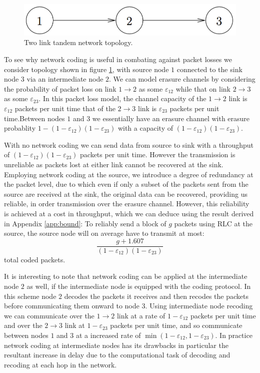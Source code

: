 \documentclass[12pt,a4paper,twoside,openright]{report}
\begin{document}
\begin{figure}[tbh]
	\centerline{\includegraphics[scale=0.9]{figs/tandem}}
	\caption{Two link tandem network topology.\cite{nc-intro}}
	\label{fig:tandem}
\end{figure}

To see why network coding is useful in combating against packet losses we consider topology shown in figure \ref{fig:tandem}, with source node $1$ connected to the sink node $3$ via an intermediate node $2$. We can model erasure channels by considering the probability of packet loss on link $1 \rightarrow 2$ as some $\varepsilon_{12}$ while that on link $2 \rightarrow 3$ as some $\varepsilon_{23}$. In this packet loss model, the channel capacity of the $1 \rightarrow 2$ link is $\varepsilon_{12}$ packets per unit time that of the $2 \rightarrow 3$ link is $\varepsilon_{23}$ packets per unit time.Between nodes $1$ and $3$ we essentially have an erasure channel with erasure probablity $1 - (1 - \varepsilon_{12})(1 - \varepsilon_{23})$ with a capacity of $(1 - \varepsilon_{12})(1 - \varepsilon_{23})$. 

With no network coding we can send data from source to sink with a throughput of $(1 - \varepsilon_{12})(1 - \varepsilon_{23})$ packets per unit time. However the transmission is unreliable as packets lost at either link cannot be recovered at the sink. Employing network coding at the source, we introduce a degree of redundancy at the packet level, due to which even if only a subset of the packets sent from the source are received at the sink, the original data can be recovered, providing us reliable, in order transmission over the erasure channel. However, this reliability is achieved at a cost in throughput, which we can deduce using the result derived in Appendix \ref{app:bound}: To reliably send a block of $g$ packets using RLC at the source, the source node will on average have to transmit at most:
\[ 
\frac{g + 1.607}{(1 - \varepsilon_{12})(1 - \varepsilon_{23})}
\]
total coded packets.

It is interesting to note that network coding can be applied at the intermediate node $2$ as well, if the intermediate node is equipped with the coding protocol. In this scheme node $2$ decodes the packets it receives and then recodes the packets before communicating them onward to node $3$. Using intermediate node recoding we can communicate over the $1 \rightarrow 2$ link at a rate of $1 - \varepsilon_{12}$ packets per unit time and over the $2 \rightarrow 3$ link at $1 - \varepsilon_{23}$ packets per unit time, and so communicate between nodes $1$ and $3$ at a increased rate of $\min (1 - \varepsilon_{12}, 1 - \varepsilon_{23})$. In practice network coding at intermediate nodes has its drawbacks in particular the resultant increase in delay due to the computational task of decoding and recoding at each hop in the network. 
\end{document}
